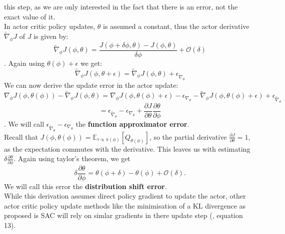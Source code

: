 this step, as we are only interested in the fact that there is an error, not the exact value of it.\\
In actor critic policy updates, $\theta$ is assumed a constant, thus the actor derivative 
$\widetilde{\nabla}_\phi J$ of $J$ is given by:
\begin{equation}
    \widetilde{\nabla}_\phi J(\phi, \theta) =  \frac{J(\phi + \delta \phi, \theta) - J(\phi, \theta)}{\delta \phi} + \mathcal{O}(\delta)
\end{equation}
. 
Again using $\theta(\phi) + \epsilon$ we get:
\begin{equation}
    \widetilde{\nabla}_\phi J(\phi, \theta + \epsilon) = \widetilde{\nabla}_\phi J(\phi, \theta) + \epsilon_{\widetilde{\nabla}_{\theta}}
\end{equation}
We can now derive the update error in the actor update:
\begin{equation}
    \label{equation:general_update_error}
    \nabla_{\phi} J(\phi, \theta(\phi)) - \widetilde{\nabla}_\phi J(\phi, \theta) = \nabla_{\phi} J(\phi, \theta(\phi) + \epsilon) - \epsilon_{\nabla_{\theta}} - \widetilde{\nabla}_\phi J(\phi, \theta(\phi) + \epsilon) + \epsilon_{\widetilde{\nabla}_{\theta}}
\end{equation}
\begin{equation*}
    = \epsilon_{\widetilde{\nabla}_{\theta}} - \epsilon_{\nabla_{\theta}} + \frac{\partial J}{\partial \theta} \frac{\partial \theta}{\partial \phi}
\end{equation*}
. We will call $\epsilon_{\widetilde{\nabla}_{\theta}} - \epsilon_{\nabla_{\theta}}$ the  \textbf{function approximator error}. \\
Recall that $J(\phi, \theta(\phi)) = \mathbb{E}_{\tau \propto \pi(\phi)}\left[Q_{\theta(\phi)}\right]$, so the partial derivative $\frac{\partial J}{\partial \theta} = 1$, 
as the expectation commutes with the derivative. This leaves us with estimating $\delta \frac{\partial \theta}{\partial \phi}$. Again using taylor's theorem, we get 
\begin{equation}
    \label{dist_shift_error}
    \delta \frac{\partial \theta}{\partial \phi} = \theta(\phi + \delta) - \theta(\phi) + \mathcal{O}(\delta).
\end{equation}
We will call this error the \textbf{distribution shift error}. \\
While this derivation assumes direct policy gradient to update the actor, other actor critic policy update methods like the minimisation of a KL divergence as 
proposed is SAC will rely on simlar gradients in there update step (\cite{haarnoja2018soft}, equation 13).

